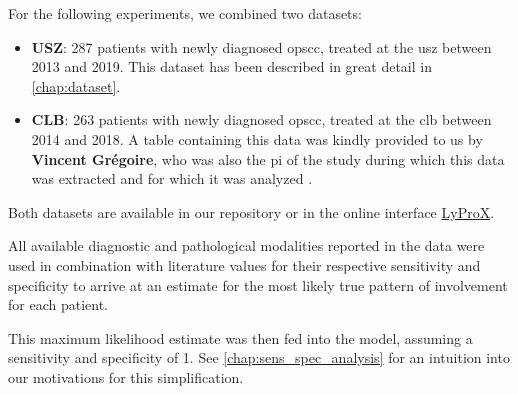 \begin{tcolorbox}[title=\faIcon{database} Data, parbox=false]
    For the following experiments, we combined two datasets:

    \begin{itemize}[leftmargin=7mm]
        \item[\faIcon{hospital}] \textbf{USZ}: 287 patients with newly diagnosed \gls{opscc}, treated at the \acrlong{usz} between 2013 and 2019. This dataset has been described in great detail in \cref{chap:dataset}.
        \item[\faIcon{hospital}] \textbf{CLB}: 263 patients with newly diagnosed \gls{opscc}, treated at the \acrlong{clb} between 2014 and 2018. A table containing this data was kindly provided to us by \textbf{Vincent Grégoire}, who was also the \gls{pi} of the study during which this data was extracted and for which it was analyzed \cite{bauwens_prevalence_2021}.
    \end{itemize}

    Both datasets are available in our repository  or in the online interface \href{https://lyprox.org/patients/dataset/}{ LyProX}.

    All available diagnostic and pathological modalities reported in the data were used in combination with literature values for their respective sensitivity and specificity \cite{de_bondt_detection_2007} to arrive at an estimate for the most likely true pattern of involvement for each patient.

    This maximum likelihood estimate was then fed into the model, assuming a sensitivity and specificity of 1. See \cref{chap:sens_spec_analysis} for an intuition into our motivations for this simplification.
\end{tcolorbox}
